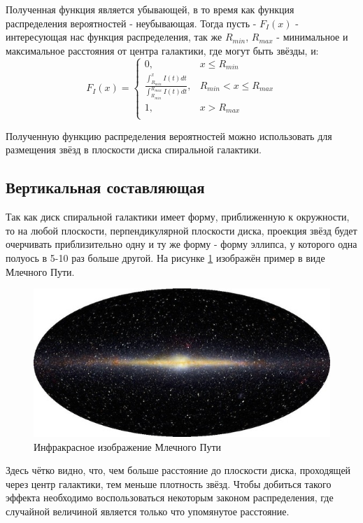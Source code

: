 Полученная функция является убывающей, в то время как функция распределения вероятностей - неубывающая. Тогда пусть - $F_I(x)$ - интересующая нас функция распределения, так же $R_{min}$, $R_{max}$ - минимальное и максимальное расстояния от центра галактики, где могут быть звёзды, и:
\begin{equation} \label{eq:F_I}
    F_I(x) = \left\{ \begin{array}{ll}
        0, & \textrm{$x \leq{} R_{min}$}\\
        \frac{\int_{R_{min}}^x I(t)dt}{\int_{R_{min}}^{R_{max}} I(t)dt}, & \textrm{$R_{min} < x \leq{} R_{max}$}\\
        1, & \textrm{$x > R_{max}$}\\
             \end{array} \right.
\end{equation}

Полученную функцию распределения вероятностей можно использовать для размещения звёзд в плоскости диска спиральной галактики.

\subsection{Вертикальная составляющая}

Так как диск спиральной галактики имеет форму, приближенную к окружности, то на любой плоскости, перпендикулярной плоскости диска, проекция звёзд будет очерчивать приблизительно одну и ту же форму - форму эллипса, у которого одна полуось в 5-10 раз больше другой. На рисунке \ref{img:miklyway} изображён пример в виде Млечного Пути.

\begin{figure}[H]
    \centering
    \includegraphics[scale=0.4]{image/MilkyWay.jpg}
    \caption{Инфракрасное изображение Млечного Пути}
    \label{img:miklyway}
\end{figure}
Здесь чётко видно, что, чем больше расстояние до плоскости диска, проходящей через центр галактики, тем меньше плотность звёзд. Чтобы добиться такого эффекта необходимо воспользоваться некоторым законом распределения, где случайной величиной является только что упомянутое расстояние.

